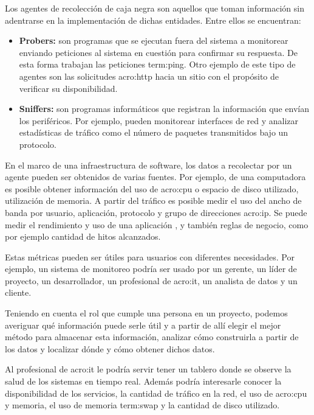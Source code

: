 Los agentes de recolección de caja negra son aquellos que toman información sin
adentrarse en la implementación de dichas entidades. Entre ellos se encuentran:

\begin{itemize}
  \item \textbf{Probers:} son programas que se ejecutan fuera del sistema a
    monitorear enviando peticiones al sistema en cuestión para confirmar su
    respuesta. De esta forma trabajan las peticiones \gls{term:ping}. Otro
    ejemplo de este tipo de agentes son las solicitudes \gls{acro:http} hacia
    un sitio  con el propósito de verificar su disponibilidad.

  \item \textbf{Sniffers:} son programas informáticos que registran la
    información que envían los periféricos. Por ejemplo, pueden monitorear
    interfaces de red y analizar estadísticas de tráfico como el número de
    paquetes transmitidos bajo un protocolo.
    \cite[p.~15-16]{monitoreo:efective_monitoring_and_alerting}
\end{itemize}

En el marco de una infraestructura de software, los datos a recolectar por un
agente pueden ser obtenidos de varias fuentes. Por ejemplo, de una computadora
es posible obtener información del uso de \gls{acro:cpu} o espacio de disco utilizado,
utilización de memoria. A partir del tráfico  es posible medir el
uso del ancho de banda por usuario, aplicación, protocolo y grupo de
direcciones \gls{acro:ip}. Se puede medir el rendimiento y uso de una
aplicación , y también reglas de negocio, como por ejemplo
cantidad de hitos alcanzados.

Estas métricas pueden ser útiles para usuarios con diferentes necesidades. Por
ejemplo, un sistema de monitoreo podría ser usado por un gerente, un líder de
proyecto, un desarrollador, un profesional de \gls{acro:it}, un analista de
datos y un cliente.

Teniendo en cuenta el rol que cumple una persona en un proyecto, podemos
averiguar qué información puede serle útil y a partir de allí elegir el mejor
método para almacenar esta información, analizar cómo construirla a partir de
los datos y localizar dónde y cómo obtener dichos datos.

Al profesional de \gls{acro:it} le podría servir tener un tablero donde se
observe la salud de los sistemas en tiempo real. Además podría interesarle
conocer la disponibilidad de los servicios, la cantidad de tráfico en la red,
el uso de \gls{acro:cpu} y memoria, el uso de memoria \gls{term:swap} y la
cantidad de disco utilizado.


